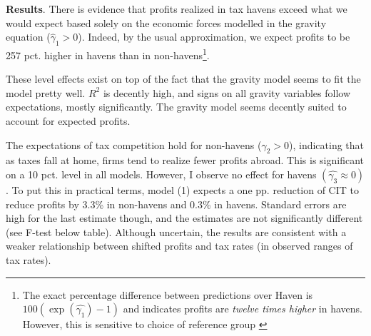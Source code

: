 \documentclass[twoside,a4paper,11pt]{article}
\begin{document}
\textbf{Results}. There is evidence that profits realized in tax havens exceed what we would expect based solely on the economic forces modelled in the gravity equation ($ \hat{\gamma}_1>0  $). Indeed, 
by the usual approximation, we expect profits to be 257 pct. higher in havens than in non-havens\footnote{The exact percentage difference between predictions over Haven is $ 100(\exp(\hat{\gamma_1})-1)$ and indicates profits are \textit{twelve times higher} in havens. However, this is sensitive to choice of reference group \autocite[225]{wooldridge_introductory_2009}}. 

These level effects exist on top of the fact that the gravity model seems to fit the model pretty well. $ R^2 $ is decently high, and signs on all gravity variables follow expectations, mostly significantly. The gravity model seems decently suited to account for expected profits. 

The expectations of tax competition hold for non-havens ($ \hat{\gamma}_2>0 $), indicating that as taxes fall at home, firms tend to realize fewer profits abroad. This is significant on a 10 pct. level in all models. However, I observe no effect for havens $ (\hat{\gamma_3}\approx0) $. To put this in practical terms, model (1) expects  a one pp. reduction of CIT to reduce profits by 3.3\% in non-havens and 0.3\% in havens. Standard errors are high for the last estimate though, and the estimates are not significantly different (see F-test below table). Although uncertain, the results are consistent with a weaker relationship between shifted profits and tax rates (in observed ranges of tax rates).
\end{document}
